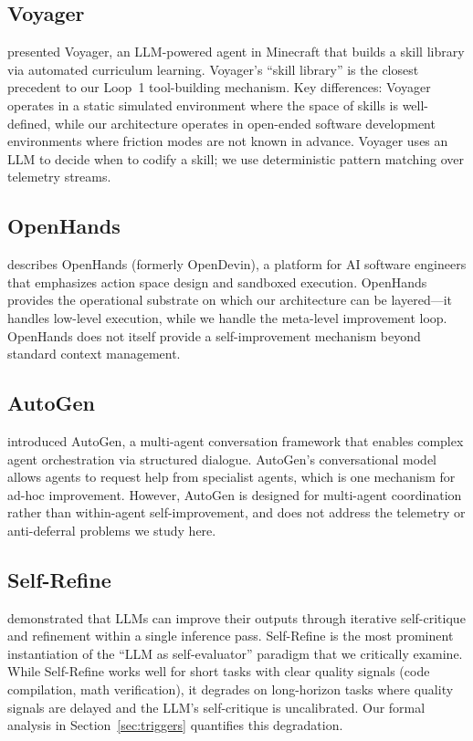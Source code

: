 \documentclass[11pt]{article}
\begin{document}
\subsection{Voyager}

\cite{wang2023voyager} presented Voyager, an LLM-powered agent in Minecraft
that builds a skill library via automated curriculum learning. Voyager's
``skill library'' is the closest precedent to our Loop~1 tool-building mechanism.
Key differences: Voyager operates in a static simulated environment where the
space of skills is well-defined, while our architecture operates in open-ended
software development environments where friction modes are not known in advance.
Voyager uses an LLM to decide when to codify a skill; we use deterministic
pattern matching over telemetry streams.

\subsection{OpenHands}

\cite{wang2024openhands} describes OpenHands (formerly OpenDevin), a platform
for AI software engineers that emphasizes action space design and sandboxed
execution. OpenHands provides the operational substrate on which our architecture
can be layered---it handles low-level execution, while we handle the
meta-level improvement loop. OpenHands does not itself provide a self-improvement
mechanism beyond standard context management.

\subsection{AutoGen}

\cite{wu2023autogen} introduced AutoGen, a multi-agent conversation framework
that enables complex agent orchestration via structured dialogue. AutoGen's
conversational model allows agents to request help from specialist agents,
which is one mechanism for ad-hoc improvement. However, AutoGen is designed
for multi-agent coordination rather than within-agent self-improvement, and
does not address the telemetry or anti-deferral problems we study here.

\subsection{Self-Refine}

\cite{madaan2023selfrefine} demonstrated that LLMs can improve their outputs
through iterative self-critique and refinement within a single inference
pass. Self-Refine is the most prominent instantiation of the ``LLM as
self-evaluator'' paradigm that we critically examine. While Self-Refine works
well for short tasks with clear quality signals (code compilation, math
verification), it degrades on long-horizon tasks where quality signals are
delayed and the LLM's self-critique is uncalibrated. Our formal analysis in
Section~\ref{sec:triggers} quantifies this degradation.
\end{document}
